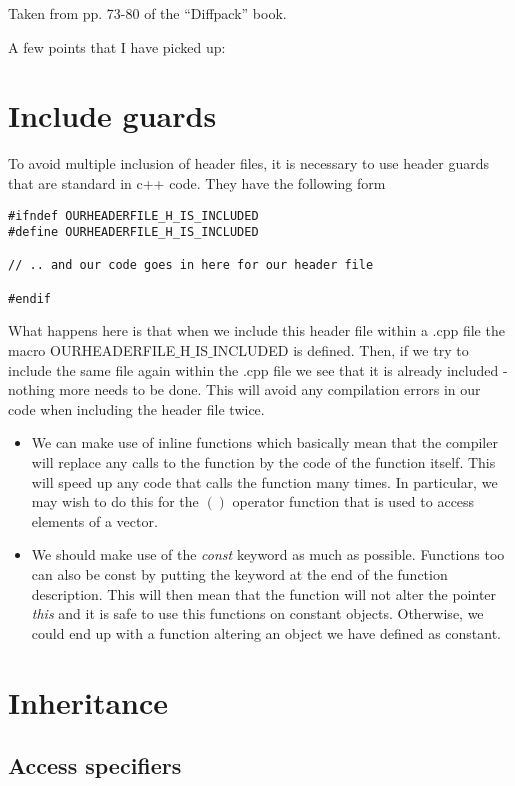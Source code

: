 Taken from pp. 73-80 of the ``Diffpack'' book.

A few points that I have picked up:

\section{Include guards}

To avoid multiple inclusion of header files, it is necessary to use header guards that are standard in c++ code. They have the following form 
\begin{verbatim}
#ifndef OURHEADERFILE_H_IS_INCLUDED
#define OURHEADERFILE_H_IS_INCLUDED

// .. and our code goes in here for our header file

#endif
\end{verbatim}

What happens here is that when we include this header file within a .cpp file the macro OURHEADERFILE$\_$H$\_$IS$\_$INCLUDED is defined. Then, if we try to include the same file again within the .cpp file we see that it is already included - nothing more needs to be done. This will avoid any compilation errors in our code when including the header file twice. 

\begin{itemize}
\item We can make use of inline functions which basically mean that the compiler will replace any calls to the function by the code of the function itself. This will speed up any code that calls the function many times. In particular, we may wish to do this for the $()$ operator function that is used to access elements of a vector.
\item We should make use of the \emph{const} keyword as much as possible. Functions too can also be const by putting the keyword at the end of the function description. This will then mean that the function will not alter the pointer \emph{this} and it is safe to use this functions on constant objects. Otherwise, we could end up with a function altering an object we have defined as constant. 
\end{itemize}


\section{Inheritance}

\subsection{Access specifiers}


